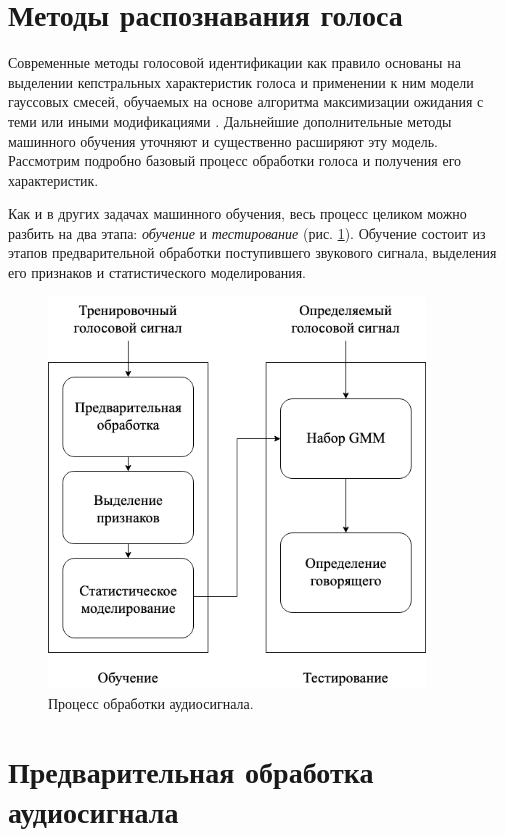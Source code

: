 \documentclass{gost-7-32}
\begin{document}
\newpage
\section{Методы распознавания голоса}

Современные методы голосовой идентификации как правило основаны на выделении кепстральных характеристик голоса и применении к ним модели гауссовых смесей, обучаемых на основе алгоритма максимизации ожидания с теми или иными модификациями \cite{bai2021}.
Дальнейшие дополнительные методы машинного обучения уточняют и существенно расширяют эту модель.
Рассмотрим подробно базовый процесс обработки голоса и получения его характеристик.

Как и в других задачах машинного обучения, весь процесс целиком можно разбить на два этапа: \textit{обучение} и \textit{тестирование} (рис. \ref{fig:audio_flow}).
Обучение состоит из этапов предварительной обработки поступившего звукового сигнала, выделения его признаков и статистического моделирования.

\begin{figure}[h!]
    \centering
    \includegraphics[width=10cm]{./audio_flow.png}
    \caption{Процесс обработки аудиосигнала.}
    \label{fig:audio_flow}
\end{figure}

\newpage
\section{Предварительная обработка аудиосигнала}
\end{document}
